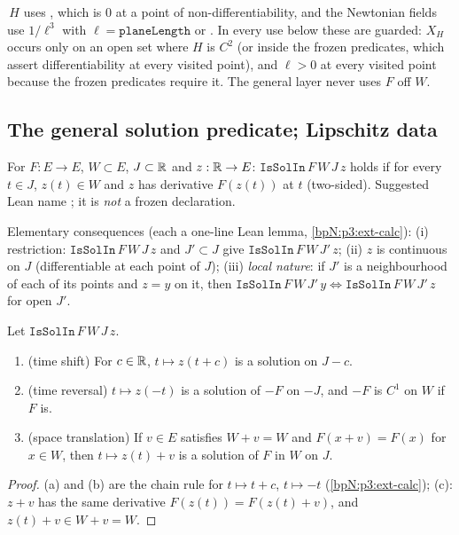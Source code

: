 \begin{remark}\label{bpN:p3:totality}
\,$H$ uses , which is $0$ at a point of non-differentiability, and the
Newtonian fields use $1/\ell^3$ with $\ell=\texttt{planeLength}$ or . In every use below these are guarded:
$X_H$ occurs only on an open set where $H$ is $C^2$ (or inside the frozen predicates, which assert differentiability
at every visited point), and $\ell>0$ at every visited point because the frozen predicates require it.
The general layer never uses $F$ off $W$.
\end{remark}

\subsection{The general solution predicate; Lipschitz data}\label{bpN:p3:s-general}

\begin{definition}[Solutions in $W$]\label{bpN:p3:gen-sol}
For $F:E\to E$, $W\subset E$, $J\subset\mathbb{R}$ and $z:\mathbb{R}\to E$: $\texttt{IsSolIn}\,F\,W\,J\,z$ holds if for every $t\in J$,
$z(t)\in W$ and $z$ has derivative $F(z(t))$ at $t$ (two-sided). Suggested Lean name
; it is \emph{not} a frozen declaration.
\end{definition}

\noindent Elementary consequences (each a one-line Lean lemma, \ref{bpN:p3:ext-calc}):
(i) restriction: $\texttt{IsSolIn}\,F\,W\,J\,z$ and $J'\subset J$ give $\texttt{IsSolIn}\,F\,W\,J'\,z$;
(ii) $z$ is continuous on $J$ (differentiable at each point of $J$);
(iii) \emph{local nature}: if $J'$ is a neighbourhood of each of its points and $z=y$ on it, then
$\texttt{IsSolIn}\,F\,W\,J'\,y\Leftrightarrow\texttt{IsSolIn}\,F\,W\,J'\,z$ for open $J'$.

\begin{lemma}[Symmetries]\label{bpN:p3:gen-symmetry}
Let $\texttt{IsSolIn}\,F\,W\,J\,z$.
\begin{enumerate}[label=(\alph*)]
\item (time shift) For $c\in\mathbb{R}$, $t\mapsto z(t+c)$ is a solution on $J-c$.
\item (time reversal) $t\mapsto z(-t)$ is a solution of $-F$ on $-J$, and $-F$ is $C^1$ on $W$ if $F$ is.
\item (space translation) If $v\in E$ satisfies $W+v=W$ and $F(x+v)=F(x)$ for $x\in W$, then $t\mapsto z(t)+v$ is a
  solution of $F$ in $W$ on $J$.
\end{enumerate}
\end{lemma}
\begin{proof}
\label{stepN:p3:sym} (a) and (b) are the chain rule for $t\mapsto t+c$, $t\mapsto-t$ (\ref{bpN:p3:ext-calc});
(c): $z+v$ has the same derivative $F(z(t))=F(z(t)+v)$, and $z(t)+v\in W+v=W$.
\end{proof}

